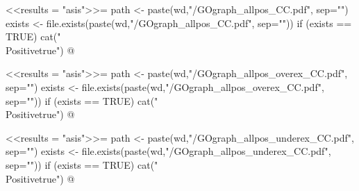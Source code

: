 \documentclass{article}
\begin{document}
\newif\ifPositive

<<results = "asis">>=
path <- paste(wd,"/GOgraph_allpos_CC.pdf", sep="")
exists <- file.exists(paste(wd,"/GOgraph_allpos_CC.pdf", sep=""))
if (exists == TRUE) {
  cat("\\Positivetrue")
}
@

\ifPositive
 \section{GO graphs of all possible DEGs - Cellular Components (CC))}
 \subsection{General GOgraph of all possible DEGs}
 This is the GO graph provided by the topGO package (Image extracted from {\bf"GOgraph\_allpos\_CC.pdf"} file):
  \begin{center}
    \texttt{[image: \\Sexpr\{path]}}
  \end{center}
\fi




\newif\ifPositive

<<results = "asis">>=
path <- paste(wd,"/GOgraph_allpos_overex_CC.pdf", sep="")
exists <- file.exists(paste(wd,"/GOgraph_allpos_overex_CC.pdf", sep=""))
if (exists == TRUE) {
  cat("\\Positivetrue")
}
@

\ifPositive
 \subsection{GOgraph showing overexpressed functions from all possible DEGs}
  This is the GO graph concerning the overexpressed DEGs from the all possible DEGs (Image extracted from {\bf"GOgraph\_allpos\_overex\_CC.pdf"} file):
  \begin{center}
    \texttt{[image: \\Sexpr\{path]}}
  \end{center}
\fi


\newif\ifPositive

<<results = "asis">>=
path <- paste(wd,"/GOgraph_allpos_underex_CC.pdf", sep="")
exists <- file.exists(paste(wd,"/GOgraph_allpos_underex_CC.pdf", sep=""))
if (exists == TRUE) {
  cat("\\Positivetrue")
}
@

\ifPositive
 \subsection{GOgraph showing underexpressed functions from all possible DEGs}
  This is the GO graph concerning the underexpressed DEGs from the all possible DEGs (Image extracted from {\bf"GOgraph\_allpos\_underex\_CC.pdf"} file):
  \begin{center}
    \texttt{[image: \\Sexpr\{path]}}
  \end{center}
\fi
\end{document}

